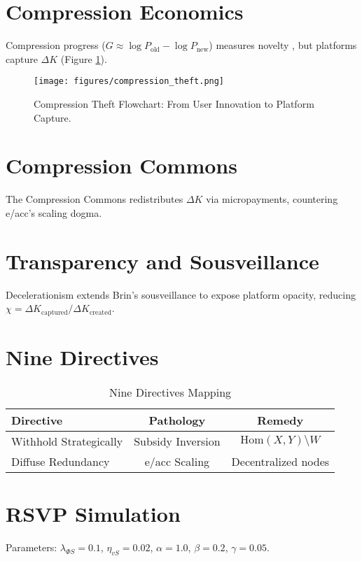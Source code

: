 \documentclass[11pt]{article}
\begin{document}
\section{Compression Economics}
\label{sec:compression}
Compression progress (\(G \approx \log P_{\text{old}} - \log P_{\text{new}}\)) measures novelty \citep{Schmidhuber2009}, but platforms capture \(\Delta K\) (Figure \ref{fig:compression}).

\begin{figure}[h]
\centering
\texttt{[image: figures/compression\_theft.png]}
\caption{Compression Theft Flowchart: From User Innovation to Platform Capture.}
\label{fig:compression}
\end{figure}

\section{Compression Commons}
\label{sec:commons}
The Compression Commons redistributes \(\Delta K\) via micropayments, countering \gls{e/acc}’s scaling dogma.

\section{Transparency and Sousveillance}
\gls{Decelerationism} extends Brin’s sousveillance \citep{Brin1998} to expose platform opacity, reducing \(\chi = \Delta K_{\text{captured}} / \Delta K_{\text{created}}\).

\section{Nine Directives}
\begin{table}[h]
\caption{Nine Directives Mapping}
\begin{center}
\begin{tabular}{lcc}
\toprule
Directive & Pathology & Remedy \\
\midrule
Withhold Strategically & Subsidy Inversion & $\text{Hom}(X,Y) \setminus W$ \\
Diffuse Redundancy & e/acc Scaling & Decentralized nodes \\
\bottomrule
\end{tabular}
\end{center}
\label{tab:directives}
\end{table}

\appendix
\section{RSVP Simulation}
Parameters: \(\lambda_{\Phi S} = 0.1\), \(\eta_{vS} = 0.02\), \(\alpha = 1.0\), \(\beta = 0.2\), \(\gamma = 0.05\).
\end{document}
